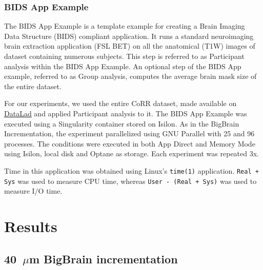 \documentclass[conference]{IEEEtran}
\newcommand{\bigbrain}{BigBrain\xspace}
\begin{document}
\subsubsection{BIDS App Example}

The BIDS App Example is a template example for creating a Brain Imaging Data Structure (BIDS)
compliant application. It runs a standard neuroimaging brain extraction application (FSL BET) 
on all the anatomical (T1W) images of dataset containing numerous subjects. This step is 
referred to as Participant analysis within the BIDS App Example. An optional
step of the BIDS App example, referred to as Group analysis, computes the average brain
mask size of the entire dataset.

For our experiments, we used the entire CoRR dataset, made available on \href{}{DataLad} and
applied Participant analysis to it. The BIDS App Example was executed using a Singularity container stored on
Isilon. As in the BigBrain Incrementation, the experiment parallelized 
using GNU Parallel with 25 and 96 processes. The conditions were executed in both App Direct and Memory Mode
using Isilon, local disk and Optane as storage. Each experiment was repeated 3x.

Time in this application was obtained using Linux's \texttt{time(1)} application.
\texttt{Real + Sys} was used to measure CPU time,
whereas \texttt{User - (Real + Sys)} was used to measure
I/O time.
\section{Results}

\subsection{40~$\mu$m \bigbrain incrementation}
\end{document}
